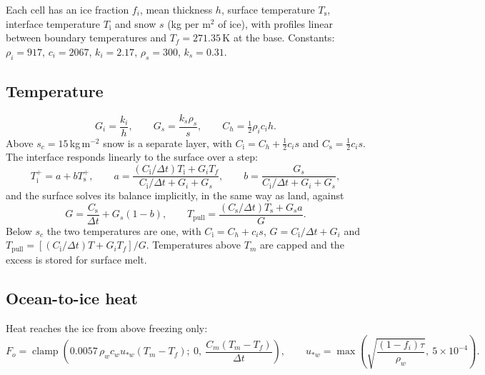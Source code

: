 \documentclass[11pt,a4paper]{article}
\newcommand{\clamp}{\operatorname{clamp}}
\begin{document}
Each cell has an ice fraction $f_i$, mean thickness $h$, surface temperature $T_{\mathrm{s}}$,
interface temperature $T_{\mathrm{i}}$ and snow $s$ (kg per m$^2$ of ice), with profiles
linear between boundary temperatures and $T_f = 271.35$\,K at the base. Constants:
$\rho_i = 917$, $c_i = 2067$, $k_i = 2.17$, $\rho_s = 300$, $k_s = 0.31$.

\subsection{Temperature}
\begin{equation}
G_i = \frac{k_i}{h}, \qquad G_s = \frac{k_s\rho_s}{s}, \qquad C_h = \tfrac12\rho_ic_ih .
\end{equation}
Above $s_c = 15$\,kg\,m$^{-2}$ snow is a separate layer, with $C_{\mathrm{i}} = C_h +
\tfrac12c_is$ and $C_{\mathrm{s}} = \tfrac12c_is$. The interface responds linearly to the
surface over a step:
\begin{equation}
T_{\mathrm{i}}^{+} = a + bT_{\mathrm{s}}^{+}, \qquad
a = \frac{(C_{\mathrm{i}}/\Delta t)T_{\mathrm{i}} + G_iT_f}{C_{\mathrm{i}}/\Delta t + G_i + G_s}, \qquad
b = \frac{G_s}{C_{\mathrm{i}}/\Delta t + G_i + G_s},
\end{equation}
and the surface solves its balance implicitly, in the same way as land, against
\begin{equation}
G = \frac{C_{\mathrm{s}}}{\Delta t} + G_s(1-b), \qquad
T_{\mathrm{pull}} = \frac{(C_{\mathrm{s}}/\Delta t)T_{\mathrm{s}} + G_s a}{G}.
\end{equation}
Below $s_c$ the two temperatures are one, with $C_{\mathrm{i}} = C_h + c_is$, $G =
C_{\mathrm{i}}/\Delta t + G_i$ and $T_{\mathrm{pull}} = [(C_{\mathrm{i}}/\Delta t)T + G_iT_f]/G$.
Temperatures above $T_m$ are capped and the excess is stored for surface melt.

\subsection{Ocean-to-ice heat}
Heat reaches the ice from above freezing only:
\begin{equation}
F_o = \clamp\!\left(0.0057\,\rho_wc_wu_{*w}(T_m - T_f);\ 0,\ \frac{C_m(T_m-T_f)}{\Delta t}\right),
\qquad
u_{*w} = \max\!\left(\sqrt{\frac{(1-f_i)\tau}{\rho_w}},\ 5\times10^{-4}\right).
\end{equation}
\end{document}
